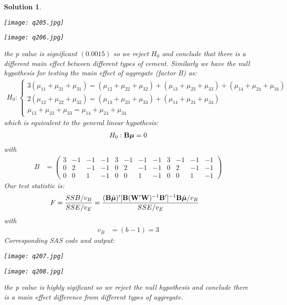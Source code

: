 \documentclass[11pt]{article}
\newtheorem{sol}{Solution}
\begin{document}
\begin{sol}
	\begin{center}
		\texttt{[image: q205.jpg]}
	\end{center}
	\begin{center}
		\texttt{[image: q206.jpg]}
	\end{center}
	the p value is significant $(0.0015)$ so we reject $H_0$ and conclude that there is a different main effect between different types of cement.\vskip 2mm
	Similarly we have the null hypothesis for testing the main effect of aggregate (factor B) as:
	\begin{align*}
		H_0: \left\{\begin{array}{l} 3(\mu_{11} + \mu_{21} + \mu_{31}) = (\mu_{12} + \mu_{22} + \mu_{32}) + (\mu_{13} + \mu_{23} + \mu_{33}) + (\mu_{14} + \mu_{24} + \mu_{34})\\ 2(\mu_{12} + \mu_{22} + \mu_{32}) = (\mu_{13} + \mu_{23} + \mu_{33}) + (\mu_{14} + \mu_{24} + \mu_{34})\\ \mu_{13} + \mu_{23} + \mu_{33} = \mu_{14} + \mu_{24} + \mu_{34}\end{array}\right.
	\end{align*}
	which is equivalent to the general linear hypothesis:
	\begin{align*}
		H_0: {\bf B}{\bm \mu}= 0
	\end{align*}
	with
	\begin{align*}
		B &= \left(\begin{array}{cccccccccccc} 3&-1&-1&-1&3&-1&-1&-1&3&-1&-1&-1\\ 0 &2&-1&-1&0&2&-1&-1&0&2&-1&-1\\ 0&0&1&-1&0&0&1&-1&0&0&1&-1\end{array}\right)
	\end{align*}
	Our test statistic is:
	\begin{align*}
		F &= \frac{SSB/v_{B}}{SSE/v_E}= \frac{({\bf B}\hat{{\bm\mu}})'[{\bf B}({\bf W}'{\bf W})^{-1}{\bf B}']^{-1}{\bf B}\hat{{\bm\mu}}/v_{B}}{SSE/v_E}
	\end{align*}
	with 
	\begin{align*}
		v_{B} &= (b - 1) = 3
	\end{align*}
	Corresponding SAS code and output:
	\begin{center}
		\texttt{[image: q207.jpg]}
	\end{center}
	\begin{center}
		\texttt{[image: q208.jpg]}
	\end{center}
	the p value is highly sigificant so we reject the null hypothesis and conclude there is a main effect difference from different types of aggregate.\vskip 2mm

\end{sol}
\end{document}
